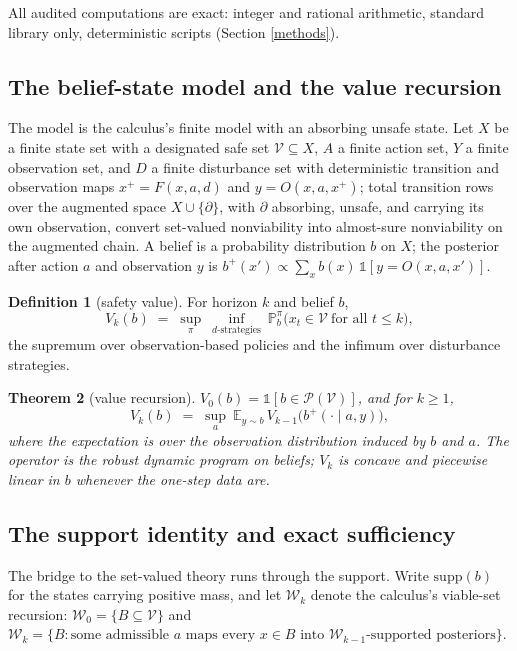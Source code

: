 \documentclass[10pt,twocolumn]{article}
\theoremstyle{plain}
\newtheorem{theorem}{Theorem}
\theoremstyle{definition}
\newtheorem{definition}[theorem]{Definition}
\theoremstyle{remark}
\begin{document}
All audited computations are exact: integer and rational arithmetic,
standard library only, deterministic scripts (Section \ref{methods}).

\subsection{The belief-state model and the value recursion}\label{model}

The model is the calculus's finite model with an absorbing unsafe state.
Let \(X\) be a finite state set with a designated safe set
\(\mathcal{V} \subseteq X\), \(A\) a finite action set, \(Y\) a finite
observation set, and \(D\) a finite disturbance set with deterministic
transition and observation maps \(x^{+} = F(x, a, d)\) and
\(y = O(x, a, x^{+})\); total transition rows over the augmented space
\(X \cup \{\partial\}\), with \(\partial\) absorbing, unsafe, and
carrying its own observation, convert set-valued nonviability into
almost-sure nonviability on the augmented chain. A belief is a
probability distribution \(b\) on \(X\); the posterior after action \(a\)
and observation \(y\) is
\(b^{+}(x') \propto \sum_{x} b(x)\,\mathbb{1}[y = O(x, a, x')]\).

\begin{definition}[safety value]\label{def:value}
For horizon \(k\) and belief \(b\),
\[
V_{k}(b) \;=\; \sup_{\pi}\ \inf_{d\text{-strategies}}\
\mathbb{P}_{b}^{\pi}\bigl(x_{t} \in \mathcal{V}\ \text{for all } t \le k\bigr),
\]
the supremum over observation-based policies and the infimum over
disturbance strategies.
\end{definition}

\begin{theorem}[value recursion]\label{thm:recursion}
\(V_{0}(b) = \mathbb{1}[b \in \mathcal{P}(\mathcal{V})]\), and for
\(k \ge 1\),
\[
V_{k}(b) \;=\; \sup_{a}\ \mathbb{E}_{y \sim b}\,
V_{k-1}\bigl(b^{+}(\cdot \mid a, y)\bigr),
\]
where the expectation is over the observation distribution induced by
\(b\) and \(a\). The operator is the robust dynamic program on beliefs;
\(V_{k}\) is concave and piecewise linear in \(b\) whenever the one-step
data are.
\end{theorem}

\subsection{The support identity and exact sufficiency}\label{support}

The bridge to the set-valued theory runs through the support. Write
\(\mathrm{supp}(b)\) for the states carrying positive mass, and let
\(\mathcal{W}_{k}\) denote the calculus's viable-set recursion:
\(\mathcal{W}_{0} = \{B \subseteq \mathcal{V}\}\) and
\(\mathcal{W}_{k} = \{B : \text{some admissible } a \text{ maps every }
x \in B \text{ into } \mathcal{W}_{k-1}\text{-supported posteriors}\}\).
\end{document}
